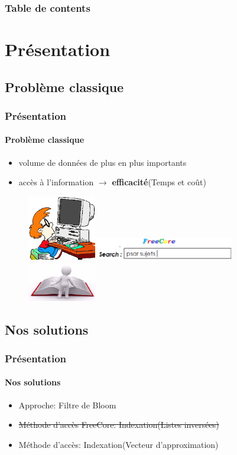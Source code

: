 \documentclass[hyperref={pdfpagemode=FullScreen,colorlinks=true},xcolor=pst,dvips]{beamer}\usepackage[french]{babel}
\title[]{\rule{\linewidth}{1pt}
		\large Recherche de filtres de Bloom similaires \\
		\large Application à la recherche par mots clés basée sur une DHT\\
		\rule{\linewidth}{1pt}
}
\author[NDOMBI TSHISUNGU \& DOAN]{\textbf{NDOMBI TSHISUNGU} Christian \& \textbf{DOAN} Cao Sang \\
			Encadrant: M. \textbf{MAKPANGOU} Mesaac, Regal}
\institute{UPMC}
\date{2 Mai 2015}
\begin{document}
	\begin{frame}
		\titlepage
	\end{frame}
	
	\begin{frame}
		\frametitle{Table de contents}
		\tableofcontents
	\end{frame}
	
	\section{Présentation}
	\subsection{Problème classique}
	\begin{frame}
		\frametitle{Présentation}
		\framesubtitle{Problème classique}
		\begin{itemize}
			\item volume de données de plus en plus importants
			\item accès à l'information $\rightarrow$ \textbf{efficacité}(Temps et coût)
		\end{itemize}
		\begin{figure}[!htbp]
			\includegraphics[width=3cm]{image1.eps}
			\includegraphics[width=6cm]{image2.eps}
			\includegraphics[width=3cm]{image.eps}
		\end{figure}		
	\end{frame}
	
	\subsection{Nos solutions}
	\begin{frame}
		\frametitle{Présentation}
		\framesubtitle{Nos solutions}	
		\begin{itemize}
			\item Approche: Filtre de Bloom
			\item \sout{Méthode d'accès FreeCore: Indexation(Listes inversées)}
			\item Méthode d'accès: Indexation(Vecteur d'approximation)
		\end{itemize}
	\end{frame}
\end{document}
